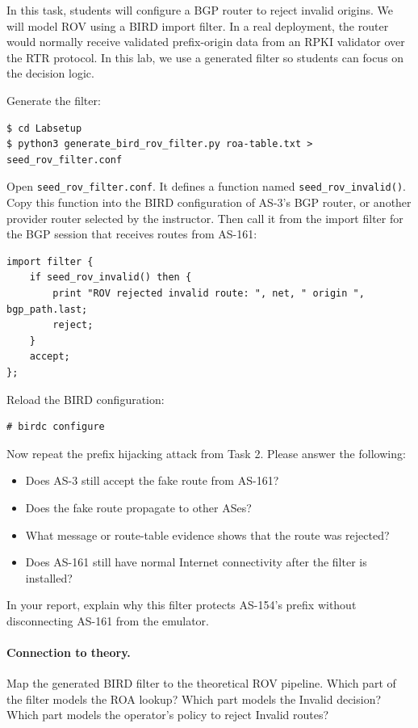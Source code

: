 In this task, students will configure a BGP router to reject invalid origins.
We will model ROV using a BIRD import filter. In a real deployment, the router
would normally receive validated prefix-origin data from an RPKI validator over
the RTR protocol. In this lab, we use a generated filter so students can focus
on the decision logic.

Generate the filter:

\begin{lstlisting}
$ cd Labsetup
$ python3 generate_bird_rov_filter.py roa-table.txt > seed_rov_filter.conf
\end{lstlisting}

Open \texttt{seed\_rov\_filter.conf}. It defines a function named
\texttt{seed\_rov\_invalid()}. Copy this function into the BIRD configuration
of AS-3's BGP router, or another provider router selected by the instructor.
Then call it from the import filter for the BGP session that receives routes
from AS-161:

\begin{lstlisting}
import filter {
    if seed_rov_invalid() then {
        print "ROV rejected invalid route: ", net, " origin ", bgp_path.last;
        reject;
    }
    accept;
};
\end{lstlisting}

Reload the BIRD configuration:

\begin{lstlisting}
# birdc configure
\end{lstlisting}

Now repeat the prefix hijacking attack from Task 2. Please answer the
following:

\begin{itemize}[noitemsep]
\item Does AS-3 still accept the fake route from AS-161?
\item Does the fake route propagate to other ASes?
\item What message or route-table evidence shows that the route was rejected?
\item Does AS-161 still have normal Internet connectivity after the filter is
      installed?
\end{itemize}

In your report, explain why this filter protects AS-154's prefix without
disconnecting AS-161 from the emulator.

\paragraph{Connection to theory.}
Map the generated BIRD filter to the theoretical ROV pipeline. Which part of
the filter models the ROA lookup? Which part models the Invalid decision? Which
part models the operator's policy to reject Invalid routes?


